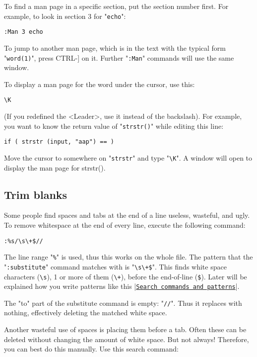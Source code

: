To find a man page in a specific section, put the section number first.
For example, to look in section 3 for "\verb!echo!":

\begin{Verbatim}[samepage=true]
 :Man 3 echo
\end{Verbatim}

To jump to another man page, which is in the text with the typical form "\verb!word(1)!", press CTRL-] on it.
Further "\verb!:Man!" commands will use the same window.

To display a man page for the word under the cursor, use this:

\begin{Verbatim}[samepage=true]
 \K
\end{Verbatim}

(If you redefined the <Leader>, use it instead of the backslash).
For example, you want to know the return value of "\verb!strstr()!" while editing
this line:

\begin{Verbatim}[samepage=true]
    if ( strstr (input, "aap") == ) 
\end{Verbatim}

Move the cursor to somewhere on "\verb!strstr!" and type "\verb!\K!".
A window will open to display the man page for strstr().
\subsection{Trim blanks}
Some people find spaces and tabs at the end of a line useless, wasteful, and ugly.
To remove whitespace at the end of every line, execute the following command:

\begin{Verbatim}[samepage=true]
 :%s/\s\+$//
\end{Verbatim}

The line range "\verb!%!" is used, thus this works on the whole file.
The pattern that the "\verb!:substitute!" command matches with is "\verb!\s\+$!".
This finds white space characters (\verb!\s!), 1 or more of them (\verb!\+!), before the end-of-line (\verb!$!).
Later will be explained how you write patterns like this |\hyperref[Search commands and patterns]{\texttt{Search commands and patterns}}|.

The "to" part of the substitute command is empty: "\verb!//!".
Thus it replaces with nothing, effectively deleting the matched white space.

Another wasteful use of spaces is placing them before a tab.
Often these can be deleted without changing the amount of white space.
But not always!  Therefore, you can best do this manually.
Use this search command:

